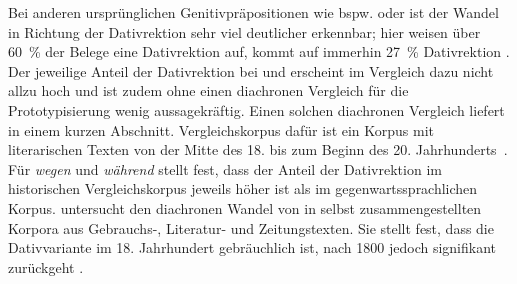 Bei anderen ursprünglichen Genitivpräpositionen wie bspw.  oder  ist der Wandel in Richtung der Dativrektion sehr viel deutlicher erkennbar; hier weisen über 60~\% der Belege eine Dativrektion auf,  kommt auf immerhin 27~\% Dativrektion \citep[s.][208]{DiMeola2000}. 
Der jeweilige Anteil der Dativrektion bei  und  erscheint im Vergleich dazu nicht allzu hoch und ist zudem
ohne einen diachronen Vergleich für die Prototypisierung wenig aussagekräftig. 
Einen solchen diachronen Vergleich liefert \citet[]{DiMeola2000} in einem kurzen Abschnitt. 
Vergleichskorpus dafür ist ein Korpus mit literarischen Texten von der Mitte des 18. bis zum Beginn des 20. Jahrhunderts~\citep[s.][231]{DiMeola2000}. 
F{\"u}r \textit{wegen }und \textit{w{\"a}hrend }stellt \citet[236]{DiMeola2000} fest, dass der Anteil der Dativrektion im historischen Vergleichskorpus jeweils h{\"o}her ist als im gegenwartssprachlichen Korpus.
\citet{Sato.2022} untersucht den diachronen Wandel von \wegen{} in selbst zusammengestellten Korpora aus Gebrauchs-, Literatur- und Zeitungstexten. Sie stellt fest, dass die Dativvariante im 18. Jahrhundert gebräuchlich ist, nach 1800 jedoch signifikant zurückgeht \citep[s.][55]{Sato.2022}. 

